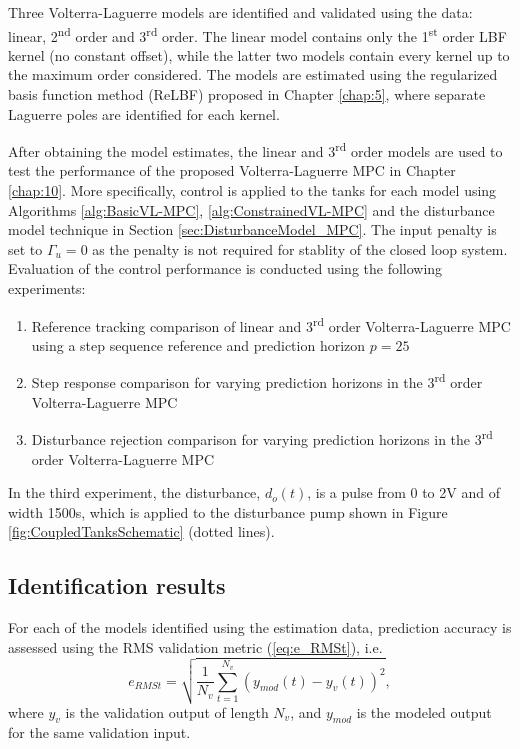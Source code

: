 Three Volterra-Laguerre models are identified and validated using the data: linear, 2\textsuperscript{nd} order and 3\textsuperscript{rd} order. The linear model contains only the 1\textsuperscript{st} order LBF kernel (no constant offset), while the latter two models contain every kernel up to the maximum order considered. The models are estimated using the regularized basis function method (ReLBF) proposed in Chapter \ref{chap:5}, where separate Laguerre poles are identified for each kernel.

After obtaining the model estimates, the linear and 3\textsuperscript{rd} order models are used to test the performance of the proposed Volterra-Laguerre MPC in Chapter \ref{chap:10}. More specifically, control is applied to the tanks for each model using Algorithms \ref{alg:BasicVL-MPC}, \ref{alg:ConstrainedVL-MPC} and the disturbance model technique in Section \ref{sec:DisturbanceModel_MPC}. The input penalty is set to $\Gamma_u = 0$ as the penalty is not required for stablity of the closed loop system. Evaluation of the control performance is conducted using the following experiments:
\begin{enumerate}
\item Reference tracking comparison of linear and 3\textsuperscript{rd} order Volterra-Laguerre MPC using a step sequence reference and prediction horizon $p=25$
\item Step response comparison for varying prediction horizons in the 3\textsuperscript{rd} order Volterra-Laguerre MPC
\item Disturbance rejection comparison for varying prediction horizons in the 3\textsuperscript{rd} order Volterra-Laguerre MPC
\end{enumerate}
In the third experiment, the disturbance, $d_o(t)$, is a pulse from 0 to 2V and of width 1500s, which is applied to the disturbance pump shown in Figure \ref{fig:CoupledTanksSchematic} (dotted lines).

\subsection{Identification results}

For each of the models identified using the estimation data, prediction accuracy is assessed using the RMS validation metric (\ref{eq:e_RMSt}), i.e.
\begin{equation}
e_{RMSt} = \sqrt{\frac{1}{N_v} \sum_{t=1}^{N_v} (y_{mod}(t) - y_v(t) )^2},
\label{eq:e_RMSt_MPC}
\end{equation}
where $y_v$ is the validation output of length $N_v$, and $y_{mod}$ is the modeled output for the same validation input.

